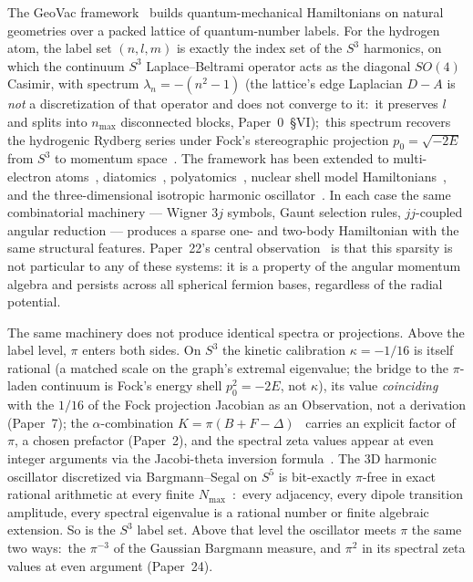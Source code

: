 \documentclass[twocolumn,pra,amsmath,amssymb,superscriptaddress]{revtex4-2}
\begin{document}
The GeoVac framework~\cite{paper0,paper1,paper7} builds
quantum-mechanical Hamiltonians on natural geometries over a packed
lattice of quantum-number labels.  For the hydrogen atom, the label
set $(n,l,m)$ is exactly the index set of the $S^3$ harmonics, on
which the continuum $S^3$ Laplace--Beltrami operator acts as the
diagonal $SO(4)$ Casimir, with spectrum $\lambda_n = -(n^2 - 1)$
(the lattice's edge Laplacian $D - A$ is \emph{not} a discretization
of that operator and does not converge to it:\ it preserves $l$ and
splits into $n_{\max}$ disconnected blocks, Paper~0~\S VI);\ this
spectrum recovers the hydrogenic Rydberg series under Fock's stereographic
projection $p_0 = \sqrt{-2E}$ from $S^3$ to momentum
space~\cite{fock1935,bander_itzykson1966}.  The framework has been
extended to multi-electron atoms~\cite{paper13},
diatomics~\cite{paper11,paper15}, polyatomics~\cite{paper17},
nuclear shell model Hamiltonians~\cite{paper23}, and the
three-dimensional isotropic harmonic oscillator~\cite{paper24}.  In
each case the same combinatorial machinery --- Wigner $3j$ symbols,
Gaunt selection rules, $jj$-coupled angular reduction --- produces a
sparse one- and two-body Hamiltonian with the same structural
features.  Paper~22's central observation~\cite{paper22} is that this
sparsity is not particular to any of these systems: it is a property
of the angular momentum algebra and persists across all spherical
fermion bases, regardless of the radial potential.

The same machinery does not produce identical spectra or
projections.  Above the label level, $\pi$ enters both sides.  On
$S^3$ the kinetic calibration $\kappa = -1/16$ is itself rational (a matched scale on the
graph's extremal eigenvalue; the bridge to the $\pi$-laden continuum is
Fock's energy shell $p_0^2 = -2E$, not $\kappa$), its value \emph{coinciding} with the
$1/16$ of the Fock projection Jacobian as an Observation, not a
derivation (Paper~7); the $\alpha$-combination $K = \pi(B + F -
\Delta)$~\cite{paper2_alpha} carries an explicit factor of $\pi$, a
chosen prefactor (Paper~2),
and the spectral
zeta values appear at even integer arguments via the Jacobi-theta
inversion formula~\cite{paper18,paper28}.  The 3D harmonic oscillator
discretized via Bargmann--Segal on $S^5$ is bit-exactly $\pi$-free in
exact rational arithmetic at every finite $N_{\max}$~\cite{paper24}:\
every adjacency, every dipole transition amplitude, every spectral
eigenvalue is a rational number or finite algebraic extension.  So is
the $S^3$ label set.  Above that level the oscillator meets $\pi$ the
same two ways:\ the $\pi^{-3}$ of the Gaussian Bargmann measure, and
$\pi^2$ in its spectral zeta values at even argument (Paper~24).
\end{document}
